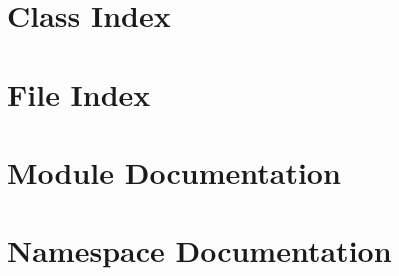 \let\mypdfximage\pdfximage\def\pdfximage{\immediate\mypdfximage}\documentclass[twoside]{book}
\newcommand{\+}{\discretionary{\mbox{\scriptsize$\hookleftarrow$}}{}{}}
\begin{document}
\chapter{Class Index}

\chapter{File Index}

\chapter{Module Documentation}














\chapter{Namespace Documentation}























\end{document}
